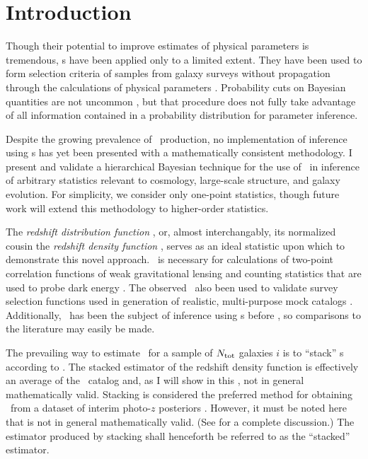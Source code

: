 \section{Introduction}

Though their potential to improve estimates of physical parameters is tremendous, \pzpdf s have been applied only to a limited extent.  
They have been used to form selection criteria of samples from galaxy surveys without propagation 
through the calculations of physical parameters \citep{VanBreukelen2009,Viironen2015}.  
Probability cuts on Bayesian quantities are not uncommon \citep{Leung2015, DiPompeo2015a}, but that procedure does not fully take advantage of all information contained in a probability distribution for parameter inference.  

Despite the growing prevalence of \pzpdf\ production, no implementation of inference using \pzpdf s has yet been presented with a mathematically consistent methodology.  
I present and validate a hierarchical Bayesian technique for the use of \pzpdf\ in inference of arbitrary statistics relevant to cosmology, large-scale structure, and galaxy evolution.  
For simplicity, we consider only one-point statistics, though future work will extend this methodology to higher-order statistics.

The \textit{redshift distribution function \Nz}, or, almost interchangably, its normalized cousin the \textit{redshift density function \nz}, serves as an ideal statistic upon which to demonstrate this novel approach.  
\Nz\ is necessary for calculations of two-point correlation functions of weak gravitational lensing and counting statistics that are used to probe dark energy \citep{Masters2015}.  
The observed \Nz\ also been used to validate survey selection functions used in generation of realistic, multi-purpose mock catalogs \citep{Norberg2002}.  
Additionally, \Nz\ has been the subject of inference using \pzpdf s before \citep{Sheldon2012, Hildebrandt2012, Kelly2014, Benjamin2013, Bonnett2015a, Viironen2015, Asorey2016, Leistedt2016}, so comparisons to the literature may easily be made. 

The prevailing way to estimate \nz\ for a sample of $N_{\mathrm{tot}}$ galaxies $i$ is to ``stack'' \pzpdf s according to .
The stacked estimator of the redshift density function is effectively an average of the \pzpdf\ catalog and, as I will show in this \paper, not in general mathematically valid.
Stacking is considered the preferred method for obtaining \Nz\ from a dataset of interim photo-$z$ posteriors \citep{Sheldon2012, Kelly2014, Benjamin2013, Bonnett2015a, Viironen2015, Asorey2016}.  
However, it must be noted here that  is not in general mathematically valid.  
(See \citet{Hogg2012} for a complete discussion.)  
The estimator produced by stacking shall henceforth be referred to as the ``stacked'' estimator.


